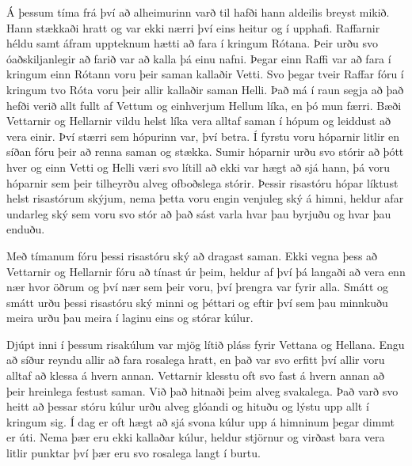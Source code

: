 \documentclass[ebook,11pt,oneside,openany]{memoir}
\begin{document}
\bigskip

Á þessum tíma frá því að alheimurinn varð til hafði hann aldeilis breyst mikið. Hann stækkaði hratt og var ekki nærri því eins heitur og í upphafi. Raffarnir héldu samt áfram uppteknum hætti að fara í kringum Rótana. Þeir urðu svo óaðskiljanlegir að farið var að kalla þá einu nafni. Þegar einn Raffi var að fara í kringum einn Rótann voru þeir saman kallaðir Vetti. Svo þegar tveir Raffar fóru í kringum tvo Róta voru þeir allir kallaðir saman Helli. Það má í raun segja að það hefði verið allt fullt af Vettum og einhverjum Hellum líka, en þó mun færri. Bæði Vettarnir og Hellarnir vildu helst líka vera alltaf saman í hópum og leiddust að vera einir. Því stærri sem hópurinn var, því betra. Í fyrstu voru hóparnir litlir en síðan fóru þeir að renna saman og stækka. Sumir hóparnir urðu svo stórir að þótt hver og einn Vetti og Helli væri svo lítill að ekki var hægt að sjá hann, þá voru hóparnir sem þeir tilheyrðu alveg ofboðslega stórir. Þessir risastóru hópar líktust helst risastórum skýjum, nema þetta voru engin venjuleg ský á himni, heldur afar undarleg ský sem voru svo stór að það sást varla hvar þau byrjuðu og hvar þau enduðu.

Með tímanum fóru þessi risastóru ský að dragast saman. Ekki vegna þess að Vettarnir og Hellarnir fóru að tínast úr þeim, heldur af því þá langaði að vera enn nær hvor öðrum og því nær sem þeir voru, því þrengra var fyrir alla. Smátt og smátt urðu þessi risastóru ský minni og þéttari og eftir því sem þau minnkuðu meira urðu þau meira í laginu eins og stórar kúlur.

Djúpt inni í þessum risakúlum var mjög lítið pláss fyrir Vettana og Hellana. Engu að síður reyndu allir að fara rosalega hratt, en það var svo erfitt því allir voru alltaf að klessa á hvern annan. Vettarnir klesstu oft svo fast á hvern annan að þeir hreinlega festust saman. Við það hitnaði þeim alveg svakalega. Það varð svo heitt að þessar stóru kúlur urðu alveg glóandi og hituðu og lýstu upp allt í kringum sig. Í dag er oft hægt að sjá svona kúlur upp á himninum þegar dimmt er úti. Nema þær eru ekki kallaðar kúlur, heldur stjörnur og virðast bara vera litlir punktar því þær eru svo rosalega langt í burtu.
\end{document}
